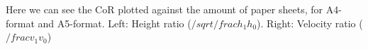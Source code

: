 \documentclass[preview]{standalone}
\begin{document}
\begin{center}
Here we can see the CoR plotted against the amount of paper sheets, for A4-format and A5-format. Left: Height ratio ($/sqrt{/frac{h_1}{h_0}}$). Right: Velocity ratio ($/frac{v_1}{v_0}$)
\end{center}
\end{document}
